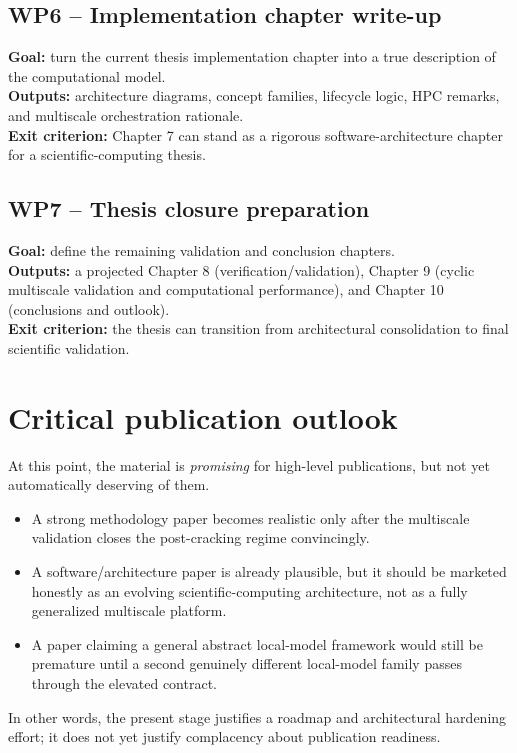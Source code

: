 \subsection*{WP6 -- Implementation chapter write-up}
\textbf{Goal:} turn the current thesis implementation chapter into a true
description of the computational model. \\
\textbf{Outputs:} architecture diagrams, concept families, lifecycle logic,
HPC remarks, and multiscale orchestration rationale. \\
\textbf{Exit criterion:} Chapter 7 can stand as a rigorous software-architecture
chapter for a scientific-computing thesis.

\subsection*{WP7 -- Thesis closure preparation}
\textbf{Goal:} define the remaining validation and conclusion chapters. \\
\textbf{Outputs:} a projected Chapter 8 (verification/validation), Chapter 9
(cyclic multiscale validation and computational performance), and Chapter 10
(conclusions and outlook). \\
\textbf{Exit criterion:} the thesis can transition from architectural
consolidation to final scientific validation.

\section{Critical publication outlook}

At this point, the material is \emph{promising} for high-level publications,
but not yet automatically deserving of them.

\begin{itemize}
  \item A strong methodology paper becomes realistic only after the
  multiscale validation closes the post-cracking regime convincingly.
  \item A software/architecture paper is already plausible, but it should be
  marketed honestly as an evolving scientific-computing architecture, not as a
  fully generalized multiscale platform.
  \item A paper claiming a general abstract local-model framework would still be
  premature until a second genuinely different local-model family passes
  through the elevated contract.
\end{itemize}

In other words, the present stage justifies a roadmap and architectural
hardening effort; it does not yet justify complacency about publication
readiness.
